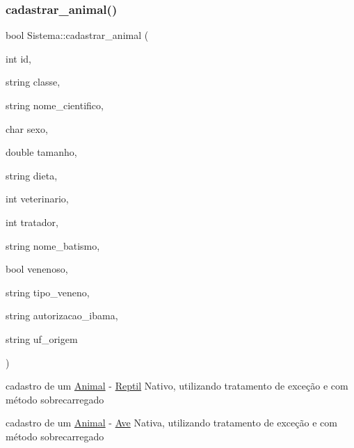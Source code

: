 \subsubsection{\texorpdfstring{cadastrar\_animal()}{cadastrar\_animal()}\hspace{0.1cm}{\footnotesize\ttfamily [11/12]}}
{\footnotesize\ttfamily bool Sistema\+::cadastrar\+\_\+animal (\begin{DoxyParamCaption}\item[{int}]{id,  }\item[{string}]{classe,  }\item[{string}]{nome\+\_\+cientifico,  }\item[{char}]{sexo,  }\item[{double}]{tamanho,  }\item[{string}]{dieta,  }\item[{int}]{veterinario,  }\item[{int}]{tratador,  }\item[{string}]{nome\+\_\+batismo,  }\item[{bool}]{venenoso,  }\item[{string}]{tipo\+\_\+veneno,  }\item[{string}]{autorizacao\+\_\+ibama,  }\item[{string}]{uf\+\_\+origem }\end{DoxyParamCaption})}



cadastro de um \mbox{\hyperlink{class_animal}{Animal}} -\/ \mbox{\hyperlink{class_reptil}{Reptil}} Nativo, utilizando tratamento de exceção e com método sobrecarregado 

cadastro de um \mbox{\hyperlink{class_animal}{Animal}} -\/ \mbox{\hyperlink{class_ave}{Ave}} Nativa, utilizando tratamento de exceção e com método sobrecarregado \mbox{\label{class_sistema_a5aa4821903f16d5183e712d7e59c95de}} 
